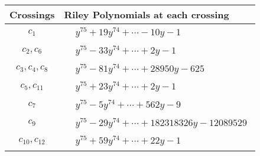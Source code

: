 \documentclass[1p]{elsarticle_modified}
\theoremstyle{definition}
\begin{document}
\begin{tabular}{m{50pt}|m{274pt}}
Crossings & \hspace{64pt}Riley Polynomials at each crossing \\
\hline $$\begin{aligned}c_{1}\end{aligned}$$&$\begin{aligned}
&y^{75}+19 y^{74}+\cdots-10 y-1
\end{aligned}$\\
\hline $$\begin{aligned}c_{2},c_{6}\end{aligned}$$&$\begin{aligned}
&y^{75}-33 y^{74}+\cdots+2 y-1
\end{aligned}$\\
\hline $$\begin{aligned}c_{3},c_{4},c_{8}\end{aligned}$$&$\begin{aligned}
&y^{75}-81 y^{74}+\cdots+28950 y-625
\end{aligned}$\\
\hline $$\begin{aligned}c_{5},c_{11}\end{aligned}$$&$\begin{aligned}
&y^{75}+23 y^{74}+\cdots+2 y-1
\end{aligned}$\\
\hline $$\begin{aligned}c_{7}\end{aligned}$$&$\begin{aligned}
&y^{75}-5 y^{74}+\cdots+562 y-9
\end{aligned}$\\
\hline $$\begin{aligned}c_{9}\end{aligned}$$&$\begin{aligned}
&y^{75}-29 y^{74}+\cdots+182318326 y-12089529
\end{aligned}$\\
\hline $$\begin{aligned}c_{10},c_{12}\end{aligned}$$&$\begin{aligned}
&y^{75}+59 y^{74}+\cdots+22 y-1
\end{aligned}$\\
\hline
\end{tabular}
\vskip 2pc
\end{document}
